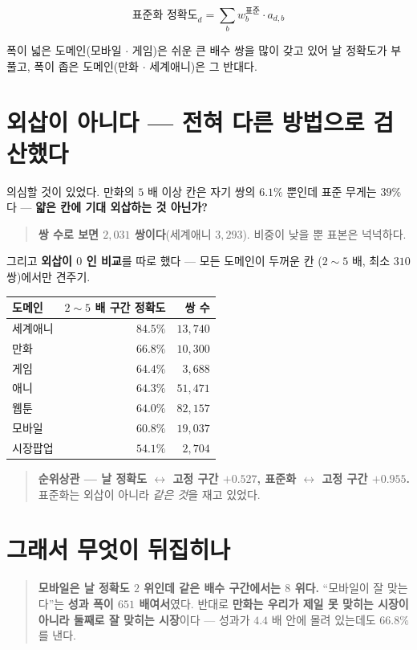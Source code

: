 \documentclass[11pt]{article}
\begin{document}
$$\text{표준화 정확도}_d = \sum_b w^{\text{표준}}_b \cdot a_{d,b}$$

폭이 넓은 도메인(모바일 $\cdot$ 게임)은 쉬운 큰 배수 쌍을 많이 갖고 있어
날 정확도가 부풀고, 폭이 좁은 도메인(만화 $\cdot$ 세계애니)은 그 반대다.

\section{외삽이 아니다 --- 전혀 다른 방법으로 검산했다}

의심할 것이 있었다. 만화의 $5$ 배 이상 칸은 자기 쌍의 $6.1\%$ 뿐인데 표준
무게는 $39\%$ 다 --- \textbf{얇은 칸에 기대 외삽하는 것 아닌가?}

\begin{quote}
\textbf{쌍 수로 보면 $2{,}031$ 쌍이다}(세계애니 $3{,}293$). 비중이 낮을 뿐
표본은 넉넉하다.
\end{quote}

그리고 \textbf{외삽이 $0$ 인 비교}를 따로 했다 --- 모든 도메인이 두꺼운 칸
($2\!\sim\!5$ 배, 최소 $310$ 쌍)에서만 견주기.

\begin{center}
\begin{tabular}{lrr}
\hline
도메인 & $2\!\sim\!5$ 배 구간 정확도 & 쌍 수 \\
\hline
세계애니 & $\mathbf{84.5\%}$ & $13{,}740$ \\
만화 & $\mathbf{66.8\%}$ & $10{,}300$ \\
게임 & $64.4\%$ & $3{,}688$ \\
애니 & $64.3\%$ & $51{,}471$ \\
웹툰 & $64.0\%$ & $82{,}157$ \\
모바일 & $60.8\%$ & $19{,}037$ \\
시장팝업 & $54.1\%$ & $2{,}704$ \\
\hline
\end{tabular}
\end{center}

\begin{quote}
\textbf{순위상관 --- 날 정확도 $\leftrightarrow$ 고정 구간 $+0.527$,
표준화 $\leftrightarrow$ 고정 구간 $\mathbf{+0.955}$.} 표준화는 외삽이
아니라 \emph{같은 것}을 재고 있었다.
\end{quote}

\section{그래서 무엇이 뒤집히나}

\begin{quote}
\textbf{모바일은 날 정확도 $2$ 위인데 같은 배수 구간에서는 $8$ 위다.}
``모바일이 잘 맞는다''는 \textbf{성과 폭이 $651$ 배여서}였다.
반대로 \textbf{만화는 우리가 제일 못 맞히는 시장이 아니라 둘째로 잘 맞히는
시장}이다 --- 성과가 $4.4$ 배 안에 몰려 있는데도 $66.8\%$ 를 낸다.
\end{quote}
\end{document}

